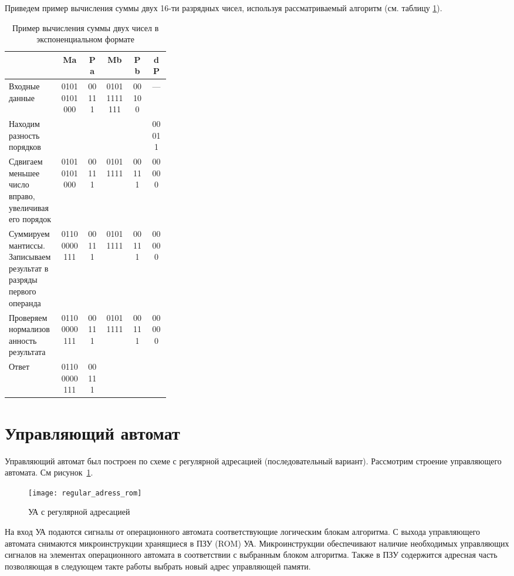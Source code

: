 \documentclass[a4paper,14pt]{extarticle}
\begin{document}
Приведем пример вычисления суммы двух 16-ти разрядных чисел, используя рассматриваемый алгоритм (см. таблицу \ref{tab:examplesum}).
\begin{table}[htbp]
	\footnotesize
	\begin{center}
		\begin{tabular}{|m{0.32\linewidth}||c|c|c|c|c|}
			\hline
			& \textbf{Ma} & \textbf{Pa} & \textbf{Mb} & \textbf{Pb} & \textbf{dP} \\ \hline \hline
			Входные данные & 01010101000 & 00111 & 01011111111 & 00100 & --- \\ \hline
			Находим разность порядков & \multicolumn{1}{l|}{} & \multicolumn{1}{l|}{} &  &  & 00011 \\ \hline
			Сдвигаем меньшее число вправо, увеличивая его порядок & 01010101000 & 00111 & 01011111 & 00111 & 00000 \\ \hline
			Суммируем мантиссы. Записываем результат в разряды первого операнда & 01100000111 & 00111 & 01011111 & 00111 & 00000 \\ \hline
			Проверяем нормализованность результата& 01100000111 & 00111 & 01011111 & 00111 & 00000 \\ \hline
			Ответ & 01100000111 & 00111 &  &  &  \\ \hline
		\end{tabular}
	\end{center}
	\caption{Пример вычисления суммы двух чисел в экспоненциальном формате}
	\label{tab:examplesum}
\end{table}


\section{Управляющий автомат}

Управляющий автомат был построен по схеме с регулярной адресацией (последовательный вариант). Рассмотрим строение управляющего автомата. См рисунок~\ref{fig:courseschemema}.


\begin{figure}[h!]
	\centering
	\texttt{[image: regular\_adress\_rom]}
	\caption{УА с регулярной адресацией}
	\label{fig:courseschemema}
\end{figure}

На вход УА подаются сигналы от операционного автомата соответствующие логическим блокам алгоритма. С выхода управляющего автомата снимаются микроинструкции хранящиеся в ПЗУ (ROM) УА. Микроинструкции обеспечивают наличие необходимых управляющих сигналов на элементах операционного автомата в соответствии с выбранным блоком алгоритма. Также в ПЗУ содержится адресная часть позволяющая в следующем такте работы выбрать новый адрес управляющей памяти.
\end{document}
